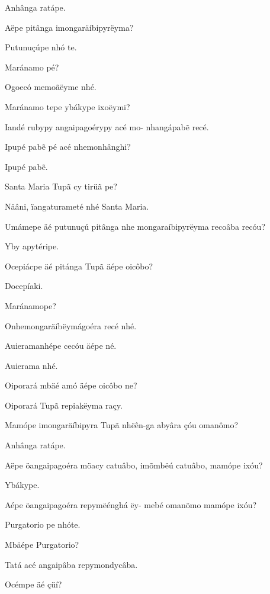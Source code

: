 \documentclass[openany,titlepage,12pt]{book}
\begin{document}
\begin{altereven}
    \item Anhânga ratápe.
    \item Aëpe pitânga imongaräíbipyrëyma?
    \item Putunuçúpe nhó te.
    \item Maránamo pé?
    \item Ogoecó memoãëyme nhé.
    \item Maránamo tepe ybákype ixoëymi?
    \item Iandé rubypy angaipagoérypy acé mo-\linebreak
    nhangápab\~e recé.
    \item Ipupé pab\~e pé acé nhemonhânghi?
    \item Ipupé pab\~e.
    \item Santa Maria Tupã cy tirüã pe?
    \item Näâni, ïangaturameté nhé Santa Maria.
    \item Umámepe äé putunuçú pitânga nhe\linebreak
    mongaraíbipyrëyma recoâba recóu?
    \item Yby apytéripe.
    \item Ocepiácpe äé pitánga Tupã äépe oicôbo?
    \item Docepíaki.
    \item Maránamope?
    \item Onhemongaräíbëymágoéra recé nhé.
    \item Auieramanhépe cecóu äépe né.
    \item Auierama nhé.
    \item Oiporará mbäé amó äépe oicôbo ne?
    \item Oiporará Tupã repiakëyma raçy.
    \item Mamópe imongaräíbipyra Tupã nhëên-ga abyâra çóu omanômo?
    \item Anhânga ratápe.
    \item Aëpe öangaipagoéra möacy catuâbo,\linebreak
    im\~ombëú catuâbo, mamópe ixóu?
    \item Ybákype.
    \item Aépe öangaipagoéra repymëénghá ëy-\linebreak
    mebé omanõmo mamópe ixóu? 
    \item Purgatorio pe nhóte.
    \item Mbäépe Purgatorio?
    \item Tatá acé angaipâba repymondycâba.
    \item Océmpe äé çüí?

\end{altereven}
\end{document}
